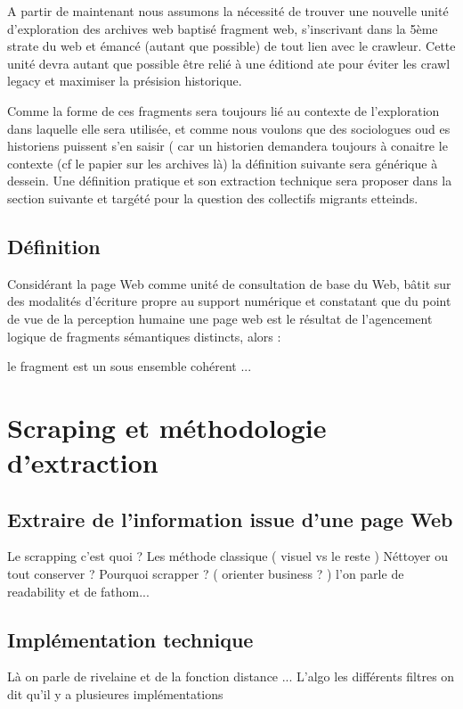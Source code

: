 \documentclass[symmetric,justified,marginals=raggedouter]{tufte-book}
\begin{document}
A partir de maintenant nous assumons la nécessité de trouver une nouvelle unité d'exploration des archives web baptisé fragment web, s'inscrivant dans la 5ème strate du web et émancé (autant que possible) de tout lien avec le crawleur. Cette unité devra autant que possible être relié à une éditiond ate pour éviter les crawl legacy et maximiser la présision historique. 

Comme la forme de ces fragments sera toujours lié au contexte de l'exploration dans laquelle elle sera utilisée, et comme nous voulons que des sociologues oud es historiens puissent s'en saisir ( car un historien demandera toujours à conaitre le contexte (cf le papier sur les archives là) la définition suivante sera générique à dessein. Une définition pratique et son extraction technique sera proposer dans la section suivante et targété pour la question des collectifs migrants etteinds.

\subsection{Définition}

Considérant la page Web comme unité de consultation de base du Web, bâtit sur des modalités d'écriture propre au support numérique et constatant que du point de vue de la perception humaine une page web est le résultat de l'agencement logique de fragments sémantiques distincts, alors :

le fragment est un sous ensemble cohérent ... 

\section{Scraping et méthodologie d'extraction}

\subsection{Extraire de l'information issue d'une page Web}

Le scrapping c'est quoi ?
Les méthode classique ( visuel vs le reste )
Néttoyer ou tout conserver ?
Pourquoi scrapper ? ( orienter business ? )
l'on parle de readability et de fathom...

\subsection{Implémentation technique}

Là on parle de rivelaine et de la fonction distance ...
L'algo 
les différents filtres
on dit qu'il y a plusieures implémentations
\end{document}
